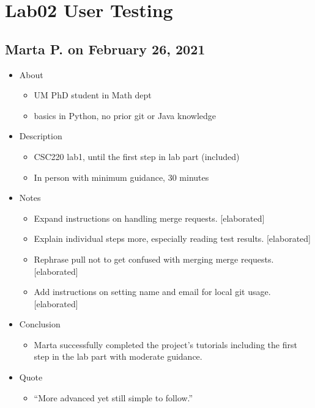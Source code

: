\section{Lab02 User Testing}\label{sec:lab02}

\subsection{Marta P. on February 26, 2021}\label{ssec:marta0226}

\begin{itemize}
\item
  {About}
  \begin{itemize}
  \item
    {UM PhD student in Math dept}
  \item
    {basics in Python, no prior git or Java knowledge}
  \end{itemize}

\item
  {Description}
  \begin{itemize}
  \item
    {CSC220 lab1, until the first step in lab part (included)}
  \item
    {In person with minimum guidance, 30 minutes}
  \end{itemize}

\item
  {Notes}
  \begin{itemize}
  \item
    {Expand instructions on handling merge requests. {[}elaborated{]}}
  \item
    {Explain individual steps more, especially reading test results. {[}elaborated{]}}
  \item
    {Rephrase pull not to get confused with merging merge requests. {[}elaborated{]}}
  \item
    {Add instructions on setting name and email for local git usage. {[}elaborated{]}}
  \end{itemize}

\item
  {Conclusion}
  \begin{itemize}
  \item
    {Marta successfully completed the project's tutorials including the first step in the lab part with moderate guidance.}
  \end{itemize}

\item
  {Quote}
  \begin{itemize}
  \item
    {``More advanced yet still simple to follow.''}
  \end{itemize}
\end{itemize}

